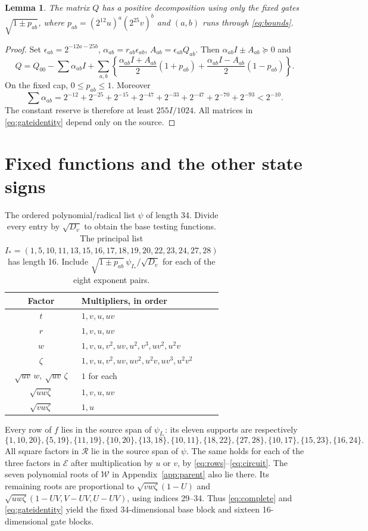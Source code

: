 \documentclass[10pt]{article}
\newtheorem{lemma}{Lemma}
\newcommand{\ps}{\succeq}
\newcommand{\E}{\mathcal E}
\newcommand{\W}{\mathcal W}
\begin{document}
\begin{lemma}\label{lem:gates}
The matrix $Q$ has a positive decomposition using only the fixed gates
$\sqrt{1\pm p_{ab}}$, where
$p_{ab}=(2^{12}u)^a(2^{25}v)^b$ and $(a,b)$ runs through
\eqref{eq:bounds}.
\end{lemma}
\begin{proof}
Set $\epsilon_{ab}=2^{-12a-25b}$,
$\alpha_{ab}=r_{ab}\epsilon_{ab}$, $A_{ab}=\epsilon_{ab}Q_{ab}$.
Then $\alpha_{ab}I\pm A_{ab}\ps0$ and
\begin{equation}
 Q=Q_{00}-\sum\alpha_{ab}I+
 \sum_{a,b}\left\{\frac{\alpha_{ab}I+A_{ab}}2(1+p_{ab})
                  +\frac{\alpha_{ab}I-A_{ab}}2(1-p_{ab})\right\}.
 \label{eq:gateidentity}
\end{equation}
On the fixed cap, $0\leq p_{ab}\leq1$. Moreover
\[
 \sum\alpha_{ab}
 =2^{-12}+2^{-25}+2^{-15}+2^{-47}+2^{-33}+2^{-47}+2^{-70}+2^{-93}
 <2^{-10}.
\]
The constant reserve is therefore at least $255I/1024$. All matrices
in \eqref{eq:gateidentity} depend only on the source.
\end{proof}

\section{Fixed functions and the other state signs}
\begin{table}[t]
\centering
\caption{The ordered polynomial/radical list $\psi$ of length 34.
Divide every entry by $\sqrt{D_v}$ to obtain the base testing functions.
The principal list $I_*=(1,5,10,11,13,15,16,17,18,19,20,22,23,24,27,28)$
has length 16. Include $\sqrt{1\pm p_{ab}}\,\psi_{I_*}/\sqrt{D_v}$
for each of the eight exponent pairs.}
\label{tab:features}
\begin{tabular}{@{}cl@{}}
\toprule
Factor& Multipliers, in order\\ \midrule
$t$&$1,v,u,uv$\\
$r$&$1,v,u,uv$\\
$w$&$1,v,u,v^2,uv,u^2,v^3,uv^2,u^2v$\\
$\zeta$&$1,v,u,v^2,uv,uv^2,u^2v,uv^3,u^2v^2$\\
$\sqrt{uv}\,w,\ \sqrt{uv}\,\zeta$&$1$ for each\\
$\sqrt{uw\zeta}$&$1,v,u,uv$\\
$\sqrt{vw\zeta}$&$1,u$\\ \bottomrule
\end{tabular}
\end{table}

Every row of $f$ lies in the source span of $\psi_{I_*}$:
its eleven supports are respectively
\[
 \{1,10,20\},\{5,19\},\{11,19\},\{10,20\},\{13,18\},
 \{10,11\},\{18,22\},\{27,28\},\{10,17\},\{15,23\},\{16,24\}.
\]
All square factors in $\mathcal R$ lie in the source span of $\psi$.
The same holds for each of the three factors in $\E$ after multiplication
by $u$ or $v$, by \eqref{eq:rows}--\eqref{eq:circuit}.
The seven polynomial roots of $\W$ in Appendix~\ref{app:parent} also lie
there. Its remaining roots are proportional to
$\sqrt{vw\zeta}(1-U)$ and
$\sqrt{uw\zeta}(1-UV,V-UV,U-UV)$, using indices 29--34.
Thus \eqref{eq:complete} and \eqref{eq:gateidentity} yield the fixed
34-dimensional base block and sixteen 16-dimensional gate blocks.
\end{document}
